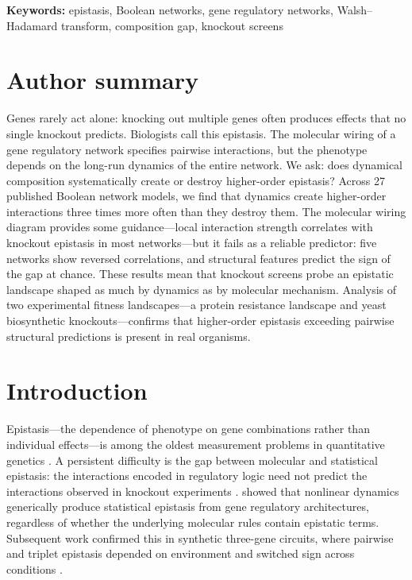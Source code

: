 \documentclass[10pt]{article}
\begin{document}
\noindent\textbf{Keywords:}
epistasis, Boolean networks, gene regulatory networks,
Walsh--Hadamard transform, composition gap, knockout screens


\section*{Author summary}
Genes rarely act alone: knocking out multiple genes often produces
effects that no single knockout predicts. Biologists call this epistasis.
The molecular wiring of a gene regulatory network specifies pairwise
interactions, but the phenotype depends on the long-run dynamics of the
entire network. We ask: does dynamical composition systematically create
or destroy higher-order epistasis? Across 27 published Boolean network
models, we find that dynamics create higher-order interactions three
times more often than they destroy them. The molecular wiring diagram
provides some guidance---local interaction strength correlates with
knockout epistasis in most networks---but it fails as a reliable
predictor: five networks show reversed correlations, and structural
features predict the sign of the gap at chance. These results mean
that knockout screens probe an epistatic landscape shaped as much by
dynamics as by molecular mechanism. Analysis of two experimental
fitness landscapes---a protein resistance landscape and yeast
biosynthetic knockouts---confirms that higher-order epistasis
exceeding pairwise structural predictions is present in real
organisms.


\section{Introduction}
\label{sec:intro}

Epistasis---the dependence of phenotype on gene combinations rather
than individual effects---is among the oldest measurement problems in
quantitative genetics \citep{fisher1918correlation, bateson1909heredity}. A
persistent difficulty is the gap between molecular and statistical
epistasis: the interactions encoded in regulatory logic need not
predict the interactions observed in knockout experiments
\citep{phillips2008epistasis}. \citet{gjuvsland2007statistical} showed
that nonlinear dynamics generically produce statistical epistasis from
gene regulatory architectures, regardless of whether the underlying
molecular rules contain epistatic terms. Subsequent work confirmed this in synthetic three-gene
circuits, where pairwise and triplet epistasis depended on environment
and switched sign across conditions \citep{baier2023environment}.
\end{document}
